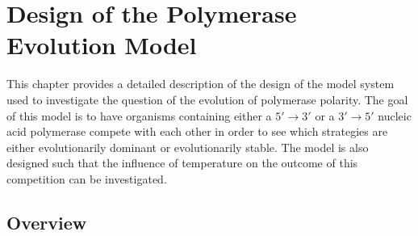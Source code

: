 \chapter{Design of the Polymerase Evolution Model} %
\label{cha:design_of_the_polymerase_evolution_model}
This chapter provides a detailed description of the design of the model system used to investigate the question of the evolution of polymerase polarity. The goal of this model is to have organisms containing either a $5'\to3'$ or a $3'\to5'$ nucleic acid polymerase compete with each other in order to see which strategies are either evolutionarily dominant or evolutionarily stable. The model is also designed such that the influence of temperature on the outcome of this competition can be investigated.
\section*{Overview} %
\label{sec:overview}

